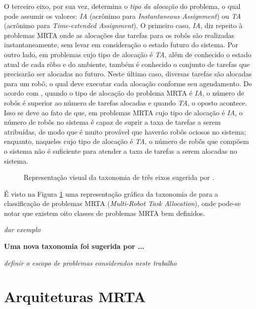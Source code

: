         O terceiro eixo, por sua vez, determina o \textit{tipo da alocação} do problema, o qual pode assumir os valores: \textit{IA} (acrônimo para \textit{Instantaneous Assignment}) ou \textit{TA} (acrônimo para \textit{Time-extended Assignment}). O primeiro caso, \textit{IA}, diz repeito à problemas MRTA onde as alocações das tarefas para os robôs são realizadas instantaneamente, sem levar em consideração o estado futuro do sistema. Por outro lado, em problemas cujo tipo de alocação é \textit{TA}, além de conhecido o estado atual de cada rôbo e do ambiente, também é conhecido o conjunto de tarefas que precisarão ser alocadas no futuro. Neste último caso, diversas tarefas são alocadas para um robô, o qual deve executar cada alocação conforme seu agendamento. De acordo com \cite{ref:bastos2008utility}, quando o tipo de alocação do problema MRTA é \textit{IA}, o número de robôs é superior ao número de tarefas alocadas e quando \textit{TA}, o oposto acontece. Isso se deve ao fato de que, em problemas MRTA cujo tipo de alocação é \textit{IA}, o número de robôs no sistema é capaz de suprir a taxa de tarefas a serem atribuídas, de modo que é muito provável que haverão robôs ociosos no sistema; enquanto, naqueles cujo tipo de alocação é \textit{TA}, o número de robôs que compõem o sistema não é suficiente para atender a taxa de tarefas a serem alocadas no sistema.
        
        \begin{figure}[htb]
            \centering
            
            \caption{Representação visual da taxonomia de três eixos sugerida por \cite{ref:gerkey2004taxonomy}.} \label{fig:taxomia_mrta}
        \end{figure}
        
        É visto na Figura \ref{fig:taxomia_mrta} uma representação gráfica da taxonomia de \cite{ref:gerkey2004taxonomy} para a classificação de problemas MRTA (\textit{Multi-Robot Task Allocation}), onde pode-se notar que existem oito classes de problemas MRTA bem definidos.
        
        \emph{\color{red} dar exemplo}
        
        \textbf{\color{red} Uma nova taxonomia foi sugerida por ...}
        
        
        \emph{\color{red} definir o escopo de problemas considerados neste trabalho}
    
    \section{Arquiteturas MRTA} \label{sec:arquiteturas_mrta}
        
